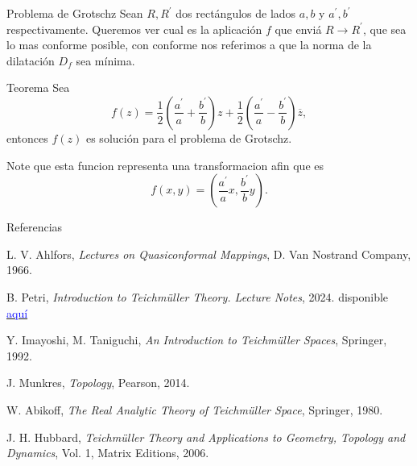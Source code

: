 \documentclass[xcolor=dvipsnames,10pt]{beamer}
\begin{document}
\begin{frame}{Problema de Grotschz}
    Sean $R,R^\prime$ dos rectángulos de lados $a,b$ y $a^\prime,b^\prime$ respectivamente. Queremos ver cual es la aplicación $f$ que enviá $R\to R^\prime$, que sea lo mas conforme posible, con conforme nos referimos a que la norma de la dilatación $D_f$ sea mínima.
    \begin{block}{Teorema}
        Sea 
        $$f(z)=\frac{1}{2}\left(\frac{a^\prime}{a}+\frac{b^\prime}{b}\right)z+\frac{1}{2}\left(\frac{a^\prime}{a}-\frac{b^\prime}{b}\right)\overline{z},$$
        entonces $f(z)$ es solución para el problema de Grotschz.
    \end{block}
    Note que esta funcion representa una transformacion afin que es 
    $$f(x,y)=\left(\frac{a^\prime}{a}x,\frac{b^\prime}{b}y\right).$$
\end{frame}

\begin{frame}{Referencias}
\begin{thebibliography}{9}

L. V. Ahlfors, \textit{Lectures on Quasiconformal Mappings}, D. Van Nostrand Company, 1966.

B. Petri, \textit{Introduction to Teichmüller Theory. Lecture Notes}, 2024. disponible \href{https://webusers.imj-prg.fr/~bram.petri/teaching_tt_2425.html}{\textcolor{blue}{aquí}}

Y. Imayoshi, M. Taniguchi, \textit{An Introduction to Teichmüller Spaces}, Springer, 1992.

J. Munkres, \textit{Topology}, Pearson, 2014.

W. Abikoff, \textit{The Real Analytic Theory of Teichmüller Space}, Springer, 1980.

J. H. Hubbard, \textit{Teichmüller Theory and Applications to Geometry, Topology and Dynamics}, Vol. 1, Matrix Editions, 2006.


\end{thebibliography}


\end{frame}
\end{document}
